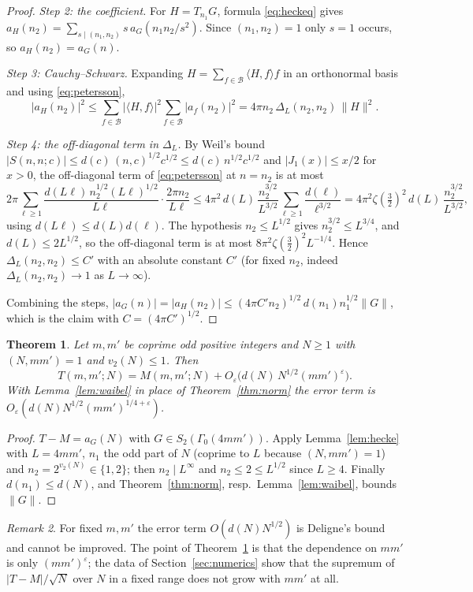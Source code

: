\documentclass[11pt]{amsart}
\newtheorem{theorem}{Theorem}[section]
\theoremstyle{remark}
\newtheorem{remark}[theorem]{Remark}
\newcommand{\e}{\varepsilon}
\begin{document}
\begin{proof}
\emph{Step 2: the coefficient.} For $H=T_{n_1}G$, formula \eqref{eq:heckeq} gives $a_H(n_2)=\sum_{s\mid(n_1,n_2)}s\,a_G(n_1n_2/s^2)$. Since $(n_1,n_2)=1$ only $s=1$ occurs, so $a_H(n_2)=a_G(n)$.

\emph{Step 3: Cauchy--Schwarz.} Expanding $H=\sum_{f\in\mathcal B}\langle H,f\rangle f$ in an orthonormal basis and using \eqref{eq:petersson},
\[
|a_H(n_2)|^2\le\sum_{f\in\mathcal B}|\langle H,f\rangle|^2\sum_{f\in\mathcal B}|a_f(n_2)|^2=4\pi n_2\,\Delta_L(n_2,n_2)\,\|H\|^2.
\]

\emph{Step 4: the off-diagonal term in $\Delta_L$.} By Weil's bound $|S(n,n;c)|\le d(c)\,(n,c)^{1/2}c^{1/2}\le d(c)\,n^{1/2}c^{1/2}$ \cite[Cor.~11.12]{IK} and $|J_1(x)|\le x/2$ for $x>0$, the off-diagonal term of \eqref{eq:petersson} at $n=n_2$ is at most
\[
2\pi\sum_{\ell\ge1}\frac{d(L\ell)\,n_2^{1/2}(L\ell)^{1/2}}{L\ell}\cdot\frac{2\pi n_2}{L\ell}
\le4\pi^2\,d(L)\,\frac{n_2^{3/2}}{L^{3/2}}\sum_{\ell\ge1}\frac{d(\ell)}{\ell^{3/2}}
=4\pi^2\zeta(\tfrac32)^2\,d(L)\,\frac{n_2^{3/2}}{L^{3/2}},
\]
using $d(L\ell)\le d(L)d(\ell)$. The hypothesis $n_2\le L^{1/2}$ gives $n_2^{3/2}\le L^{3/4}$, and $d(L)\le2L^{1/2}$, so the off-diagonal term is at most $8\pi^2\zeta(\frac32)^2L^{-1/4}$. Hence $\Delta_L(n_2,n_2)\le C'$ with an absolute constant $C'$ (for fixed $n_2$, indeed $\Delta_L(n_2,n_2)\to1$ as $L\to\infty$).

Combining the steps, $|a_G(n)|=|a_H(n_2)|\le(4\pi C'n_2)^{1/2}\,d(n_1)n_1^{1/2}\|G\|$, which is the claim with $C=(4\pi C')^{1/2}$.
\end{proof}

\begin{theorem}\label{thm:unif}
Let $m,m'$ be coprime odd positive integers and $N\ge1$ with $(N,mm')=1$ and $v_2(N)\le1$. Then
\[
T(m,m';N)=M(m,m';N)+O_\e\bigl(d(N)\,N^{1/2}(mm')^{\e}\bigr).
\]
With Lemma~\ref{lem:waibel} in place of Theorem~\ref{thm:norm} the error term is $O_\e(d(N)N^{1/2}(mm')^{1/4+\e})$.
\end{theorem}
\begin{proof}
$T-M=a_G(N)$ with $G\in S_2(\Gamma_0(4mm'))$. Apply Lemma~\ref{lem:hecke} with $L=4mm'$, $n_1$ the odd part of $N$ (coprime to $L$ because $(N,mm')=1$) and $n_2=2^{v_2(N)}\in\{1,2\}$; then $n_2\mid L^\infty$ and $n_2\le2\le L^{1/2}$ since $L\ge4$. Finally $d(n_1)\le d(N)$, and Theorem~\ref{thm:norm}, resp.\ Lemma~\ref{lem:waibel}, bounds $\|G\|$.
\end{proof}

\begin{remark}
For fixed $m,m'$ the error term $O(d(N)N^{1/2})$ is Deligne's bound and cannot be improved. The point of Theorem~\ref{thm:unif} is that the dependence on $mm'$ is only $(mm')^\e$; the data of Section~\ref{sec:numerics} show that the supremum of $|T-M|/\sqrt N$ over $N$ in a fixed range does not grow with $mm'$ at all.
\end{remark}
\end{document}
